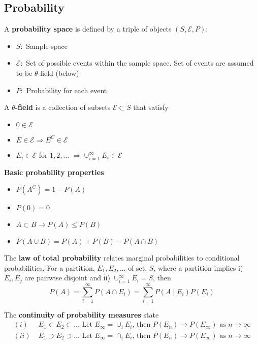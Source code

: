 \documentclass{article}
\begin{document}
\subsection{Probability}
A \textbf{probability space} is defined by a triple of objects $(S, \mathcal{E}, P)$:
\begin{itemize}
    \item $S:$ Sample space
    \item $\mathcal{E}:$ Set of possible events within the sample space. Set of events are assumed to be $\theta$-field (below)
    \item $P:$ Probability for each event
\end{itemize}
A \textbf{$\theta$-field} is a collection of subsets $\mathcal{E} \subset S$ that satisfy
\begin{itemize}
    \item $0 \in \mathcal{E}$
    \item $E \in \mathcal{E} \Rightarrow E^C \in \mathcal{E}$
    \item $E_i \in \mathcal{E}$ for {$1, 2, \dots$} $\Rightarrow \cup_{i=1}^\infty E_i \in \mathcal{E}$
\end{itemize}
\textbf{Basic probability properties}
\begin{itemize}
	\item $P(A^C)=1 - P(A)$
	\item $P(0)=0$
	\item $A\subset B \longrightarrow P(A) \leq P(B)$
	\item $P(A \cup B)=P(A)+P(B) - P(A \cap B)$ 
\end{itemize}
The \textbf{law of total probability} relates marginal probabilities to conditional probabilities. For a partition, {$E_1, E_2, \dots$} of set, $S$, where a partition implies i) $E_i, E_j$ are pairwise disjoint and ii) $\cup_{i=1}^\infty E_i = S$, then
\begin{equation*}
     P(A) = \sum_{i=1}^\infty P(A\cap E_i) = \sum_{i=1}^\infty P(A \mid E_i) P(E_i)
\end{equation*}


\noindent The \textbf{continuity of probability measures} state
\begin{align*}
    (i) \;& E_1 \subset E_2 \subset \dots \textrm{   Let } E_\infty = \cup_i E_i \textrm{, then } P(E_n) \longrightarrow P(E_\infty) \textrm{ as } n \longrightarrow \infty\\
    (ii) \;& E_1 \supset E_2 \supset \dots \textrm{   Let } E_\infty = \cap_i E_i \textrm{, then } P(E_n) \longrightarrow P(E_\infty) \textrm{ as } n \longrightarrow \infty\\\\
\end{align*}
\end{document}

